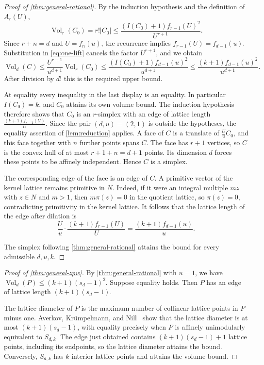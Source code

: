 \documentclass[reqno, 11pt]{article}
\numberwithin{equation}{section}
\theoremstyle{definition}
\DeclareMathOperator{\Vol}{Vol}
\begin{document}
\begin{proof}[Proof of \cref{thm:general-rational}]
By the induction hypothesis and the definition of $A_r(U)$,
\[
 \Vol_r(C_0)=r!|C_0|
     \le \frac{(I(C_0)+1)f_{r-1}(U)^2}{U^{r+1}}.
\]
Since $r+n=d$ and $U=f_n(u)$, the recurrence implies
$f_{r-1}(U)=f_{d-1}(u)$. Substitution in \eqref{eq:one-lift}
cancels the factor $U^{r+1}$, and we obtain
\[
 \Vol_d(C)
 \le\frac{U^{r+1}}{u^{d+1}}\Vol_r(C_0)
 \le\frac{(I(C_0)+1)f_{d-1}(u)^2}{u^{d+1}}
 \le\frac{(k+1)f_{d-1}(u)^2}{u^{d+1}} .
\]
After division by $d!$ this is the required upper bound.

At equality every inequality in the last display is an equality.
In particular $I(C_0)=k$, and $C_0$ attains its own volume bound.
The induction hypothesis therefore shows that $C_0$ is an
$r$-simplex with an edge of lattice length
$\frac{(k+1)f_{r-1}(U)}{U}$. Since the pair $(d,u)=(2,1)$ is
outside the hypotheses, the equality assertion of
\cref{lem:reduction} applies. A face of $C$ is a translate of
$\frac{U}{u}C_0$, and this face together with $n$ further points
spans $C$. The face has $r+1$ vertices, so $C$ is the convex hull of
at most $r+1+n=d+1$ points. Its dimension $d$ forces these points to
be affinely independent. Hence $C$ is a simplex.

The corresponding edge of the face is an edge of $C$. A primitive
vector of the kernel lattice remains primitive in $N$. Indeed, if
it were an integral multiple $m z$ with $z\in N$ and $m>1$, then
$m\pi(z)=0$ in the quotient lattice, so $\pi(z)=0$, contradicting
primitivity in the kernel lattice. It follows that the lattice length
of the edge after dilation is
\[
 \frac{U}{u}\cdot\frac{(k+1)f_{r-1}(U)}{U}
 =\frac{(k+1)f_{d-1}(u)}{u} .
\]

The simplex following \cref{thm:general-rational} attains the bound
for every admissible $d,u,k$.
\end{proof}

\begin{proof}[Proof of \cref{thm:general-zpw}]
By \cref{thm:general-rational} with $u=1$, we have
$\Vol_d(P)\le(k+1)(s_d-1)^2$. Suppose equality holds. Then $P$
has an edge of lattice length $(k+1)(s_d-1)$.

The lattice diameter of $P$ is the maximum number of collinear lattice
points in $P$ minus one. Averkov, Kr\"umpelmann, and
Nill~\cite[Theorem~2.8 and the discussion of~(2.5)]{AKN} show that
the lattice diameter is at most $(k+1)(s_d-1)$,
with equality precisely when $P$ is affinely unimodularly equivalent
to $S_{d,k}$. The edge just obtained contains $(k+1)(s_d-1)+1$ lattice
points, including its endpoints, so the lattice diameter attains the bound. Conversely, $S_{d,k}$ has $k$ interior lattice points and
attains the volume bound.
\end{proof}
\end{document}
